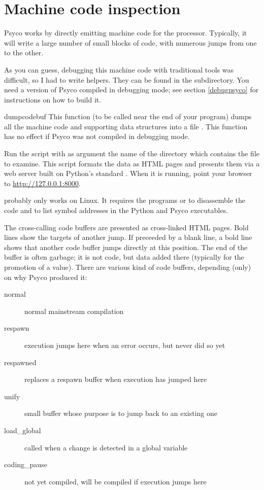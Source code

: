 \documentclass{manual}
\begin{document}
\section{Machine code inspection}

Psyco works by directly emitting machine code for the processor.  Typically, it will write a large number of small blocks of code, with numerous jumps from one to the other.

As you can guess, debugging this machine code with traditional tools was difficult, so I had to write helpers.  They can be found in the  subdirectory.  You need a version of Psyco compiled in debugging mode; see section \ref{debugpsyco} for instructions on how to build it.

\begin{funcdesc}{dumpcodebuf}{}
  This function (to be called near the end of your program) dumps all the machine code and supporting data structures into a file .  This function has no effect if Psyco was not compiled in debugging mode.
\end{funcdesc}

Run the script  with as argument the name of the directory which contains the  file to examine.  This script formats the data as HTML pages and presents them via a web server built on Python's standard .  When it is running, point your browser to \url{http://127.0.0.1:8000}.

 probably only works on Linux.  It requires the programs  or  to disassemble the code and  to list symbol addresses in the Python and Psyco executables.

The cross-calling code buffers are presented as cross-linked HTML pages.  Bold lines show the targets of another jump.  If preceeded by a blank line, a bold line shows that another code buffer jumps directly at this position.  The end of the buffer is often garbage; it is not code, but data added there (typically for the promotion of a value).  There are various kind of code buffers, depending (only) on why Psyco produced it:
%
\begin{description}
\item[normal]        normal mainstream compilation
\item[respawn]       execution jumps here when an error occurs, but never did so yet
\item[respawned]     replaces a respawn buffer when execution has jumped here
\item[unify]         small buffer whose purpose is to jump back to an existing one
\item[load_global]   called when a change is detected in a global variable
\item[coding_pause]  not yet compiled, will be compiled if execution jumps here
\end{description}
\end{document}
